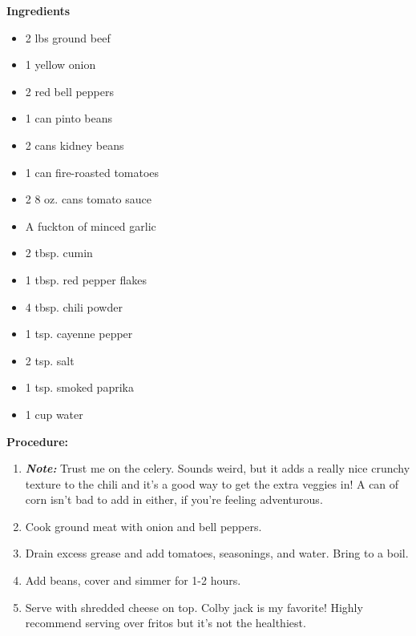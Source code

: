\begin{multicols}{2}
\textbf{Ingredients}
\begin{itemize}
\item 2 lbs ground beef
\item 1 yellow onion
\item 2 red bell peppers
\item 1 can pinto beans
\item 2 cans kidney beans
\item 1 can fire-roasted tomatoes
\item 2 8 oz. cans tomato sauce
\item A fuckton of minced garlic
\item 2 tbsp. cumin
\item 1 tbsp. red pepper flakes
\item 4 tbsp. chili powder
\item 1 tsp. cayenne pepper
\item 2 tsp. salt
\item 1 tsp. smoked paprika
\item 1 cup water 



\end{itemize}


\columnbreak
\textbf{Procedure:}

\begin{enumerate}
\item \textit{\textbf{Note:}} Trust me on the celery. Sounds weird, but it adds a really nice crunchy texture to the chili and it's a good way to get the extra veggies in! A can of corn isn't bad to add in either, if you're feeling adventurous.
\item Cook ground meat with onion and bell peppers. 

\item Drain excess grease and add tomatoes, seasonings, and water. Bring to a boil. 

\item Add beans, cover and simmer for 1-2 hours. 

\item Serve with shredded cheese on top. Colby jack is my favorite! Highly recommend serving over fritos but it's not the healthiest. 
\end{enumerate}


\end{multicols}
